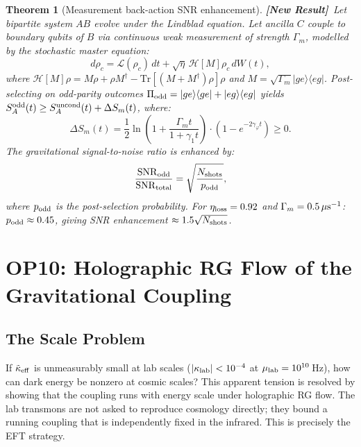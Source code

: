 \documentclass[12pt]{article}
\newtheorem{theorem}{Theorem}
\newcommand{\newresult}{\textbf{[New Result]}}
\begin{document}
\begin{theorem}[Measurement back-action SNR enhancement]
\label{thm:SNR}
\newresult\ Let bipartite system $AB$ evolve under the Lindblad equation.
Let ancilla $C$ couple to boundary qubits of $B$ via continuous weak measurement
of strength $\Gamma_m$, modelled by the stochastic master equation:
\begin{equation}
d\rho_c = \mathcal{L}(\rho_c)\,dt
+ \sqrt{\eta}\,\mathcal{H}[M]\rho_c\,dW(t),
\label{eq:SME}
\end{equation}
where $\mathcal{H}[M]\rho = M\rho + \rho M^\dagger - \mathrm{Tr}[(M+M^\dagger)\rho]\rho$
and $M = \sqrt{\Gamma_m}|ge\rangle\langle eg|$.
Post-selecting on odd-parity outcomes
$\Pi_{\rm odd} = |ge\rangle\langle ge| + |eg\rangle\langle eg|$ yields
$S_A^{\rm odd}(t) \ge S_A^{\rm uncond}(t) + \Delta S_m(t)$, where:
\begin{equation}
\Delta S_m(t)
= \frac{1}{2}\ln\!\left(1 + \frac{\Gamma_m t}{1+\gamma_1 t}\right)
\cdot\left(1-e^{-2\gamma_\varphi t}\right)\ge 0.
\label{eq:DS_m}
\end{equation}
The gravitational signal-to-noise ratio is enhanced by:
\begin{equation}
\frac{{\rm SNR}_{\rm odd}}{{\rm SNR}_{\rm total}}
= \sqrt{\frac{N_{\rm shots}}{p_{\rm odd}}},
\label{eq:SNR_enhancement}
\end{equation}
where $p_{\rm odd}$ is the post-selection probability.
For $\eta_{\rm loss} = 0.92$ and $\Gamma_m = 0.5\,\mu{\rm s}^{-1}$:
$p_{\rm odd} \approx 0.45$, giving SNR enhancement $\approx 1.5\sqrt{N_{\rm shots}}$.
\end{theorem}

\section{OP10: Holographic RG Flow of the Gravitational Coupling}
\label{sec:RG}

\subsection{The Scale Problem}

If $\tilde{\kappa}_{\rm eff}$ is unmeasurably small at lab scales
($|\kappa_{\rm lab}| < 10^{-4}$ at $\mu_{\rm lab} = 10^{10}\,$Hz), how can dark energy be
nonzero at cosmic scales? This apparent tension is resolved by showing that the coupling
runs with energy scale under holographic RG flow. The lab transmons are not asked to
reproduce cosmology directly; they bound a running coupling that is independently fixed
in the infrared. This is precisely the EFT strategy.
\end{document}
